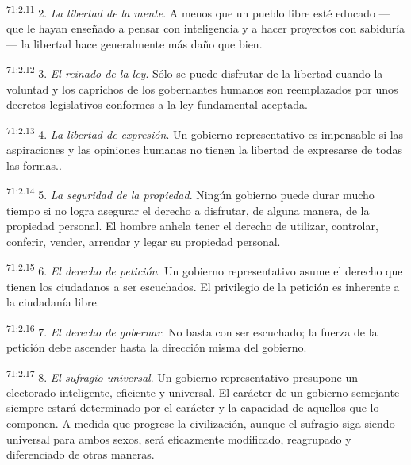 \documentclass[twoside, 11pt]{book}
\begin{document}
\par
\textsuperscript{71:2.11} 2. \textit{La libertad de la mente}. A menos que un pueblo libre esté educado ---que le hayan enseñado a pensar con inteligencia y a hacer proyectos con sabiduría--- la libertad hace generalmente más daño que bien.

\par
\textsuperscript{71:2.12} 3. \textit{El reinado de la ley}. Sólo se puede disfrutar de la libertad cuando la voluntad y los caprichos de los gobernantes humanos son reemplazados por unos decretos legislativos conformes a la ley fundamental aceptada.

\par
\textsuperscript{71:2.13} 4. \textit{La libertad de expresión}. Un gobierno representativo es impensable si las aspiraciones y las opiniones humanas no tienen la libertad de expresarse de todas las formas..

\par
\textsuperscript{71:2.14} 5. \textit{La seguridad de la propiedad}. Ningún gobierno puede durar mucho tiempo si no logra asegurar el derecho a disfrutar, de alguna manera, de la propiedad personal. El hombre anhela tener el derecho de utilizar, controlar, conferir, vender, arrendar y legar su propiedad personal.

\par
\textsuperscript{71:2.15} 6. \textit{El derecho de petición}. Un gobierno representativo asume el derecho que tienen los ciudadanos a ser escuchados. El privilegio de la petición es inherente a la ciudadanía libre.

\par
\textsuperscript{71:2.16} 7. \textit{El derecho de gobernar}. No basta con ser escuchado; la fuerza de la petición debe ascender hasta la dirección misma del gobierno.

\par
\textsuperscript{71:2.17} 8. \textit{El sufragio universal}. Un gobierno representativo presupone un electorado inteligente, eficiente y universal. El carácter de un gobierno semejante siempre estará determinado por el carácter y la capacidad de aquellos que lo componen. A medida que progrese la civilización, aunque el sufragio siga siendo universal para ambos sexos, será eficazmente modificado, reagrupado y diferenciado de otras maneras.
\end{document}
